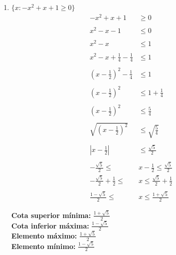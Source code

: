 \documentclass[12pt]{article}
\begin{document}
\begin{enumerate}[label=\textit{\roman*})]
    \item $\{x : -x^2 + x + 1 \geq 0\}$ \\
        \begin{align*}
            -x^2 + x + 1 &\geq 0 \\ \\
            x^2 - x - 1 &\leq 0 \\ \\
            x^2 - x &\leq 1 \\ \\
            x^2 - x + \frac{1}{4} - \frac{1}{4} &\leq 1 \\ \\
            (x - \frac{1}{2})^2 - \frac{1}{4} &\leq 1 \\ \\
            (x - \frac{1}{2})^2 &\leq 1 + \frac{1}{4} \\ \\
            (x - \frac{1}{2})^2 &\leq \frac{5}{4} \\ \\
            \sqrt{(x - \frac{1}{2})^2} &\leq \sqrt{\frac{5}{4}} \\ \\
            |x - \frac{1}{2}| &\leq \frac{\sqrt{5}}{2} \\ \\
            -\frac{\sqrt{5}}{2} \leq \, &x - \frac{1}{2} \leq \frac{\sqrt{5}}{2} \\
            -\frac{\sqrt{5}}{2} + \frac{1}{2} \leq \, &x \leq \frac{\sqrt{5}}{2} + \frac{1}{2} \\ \\
            \frac{1 - \sqrt{5}}{2} \leq \,&x \leq \frac{1 + \sqrt{5}}{2}
        \end{align*}

    \textbf{Cota superior mínima:} $\frac{1 + \sqrt{5}}{2}$  \\
    \textbf{Cota inferior máxima:} $\frac{1 - \sqrt{5}}{2}$ \\
    \textbf{Elemento máximo:} $\frac{1 + \sqrt{5}}{2}$\\
    \textbf{Elemento mínimo:} $\frac{1 - \sqrt{5}}{2}$\\



\end{enumerate}
\end{document}
